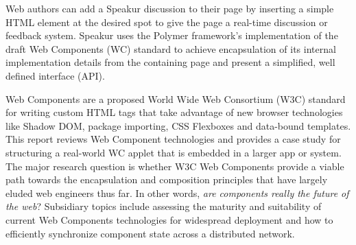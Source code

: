 \documentclass[12pt]{report}	%
\theoremstyle{definition}
\theoremstyle{remark}
\begin{document}
Web authors can add a Speakur discussion to their page by inserting a simple HTML element at the desired spot to give the page a real-time discussion or feedback system.
Speakur uses the Polymer framework's implementation of the draft Web Components (WC) standard to achieve encapsulation of its internal implementation details from the containing page and present a simplified, well defined interface (API).

Web Components are a proposed World Wide Web Consortium (W3C) standard for writing custom HTML tags that take advantage of new browser technologies like Shadow DOM, package importing, CSS Flexboxes and data-bound templates.
This report reviews Web Component technologies and provides a case study for structuring a real-world WC applet that is embedded in a larger app or system.
The major research question is whether W3C Web Components provide a viable path towards the encapsulation and composition principles that have largely eluded web engineers thus far. 
In other words, \textit{are components really the future of the web}? 
Subsidiary topics include assessing the maturity and suitability of current Web Components technologies for widespread deployment and how to efficiently synchronize component state across a distributed network.


\tableofcontents   %

\listoftables      %
\listoffigures     %



%
%







\end{document}
